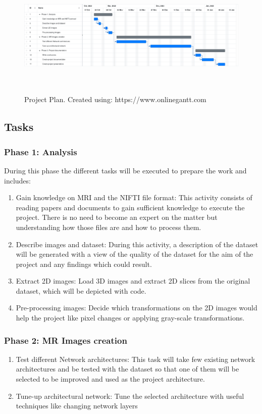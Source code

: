 \begin{figure}[ht]
    \centering
    \includegraphics[width = 17cm, height = 6cm]{images/project-plan.png}
    \caption[Project Plan]{Project Plan. Created using: https://www.onlinegantt.com}
    \label{fig:project-plan}
\end{figure}

\newpage
\subsection{Tasks}
\subsubsection*{Phase 1: Analysis}

During this phase the different tasks will be executed to prepare the work and includes:
\begin{enumerate}
    \item Gain knowledge on MRI and the NIFTI file format: This activity consists of reading papers and documents to gain sufficient knowledge to execute the project. There is no need to become an expert on the matter but understanding how those files are and how to process them.
    \item Describe images and dataset: During this activity, a description of the dataset will be generated with a view of the quality of the dataset for the aim of the project and any findings which could result.
    \item Extract 2D images: Load 3D images and extract 2D slices from the original dataset, which will be depicted with code.
    \item Pre-processing images: Decide which transformations on the 2D images would help the project like pixel changes or applying gray-scale transformations.
\end{enumerate}

\subsubsection*{Phase 2: MR Images creation}

\begin{enumerate}
    \item Test different Network architectures: This task will take few existing network architectures and be tested with the dataset so that one of them will be selected to be improved and used as the project architecture.
    \item Tune-up architectural network: Tune the selected architecture with useful techniques like changing network layers
\end{enumerate}